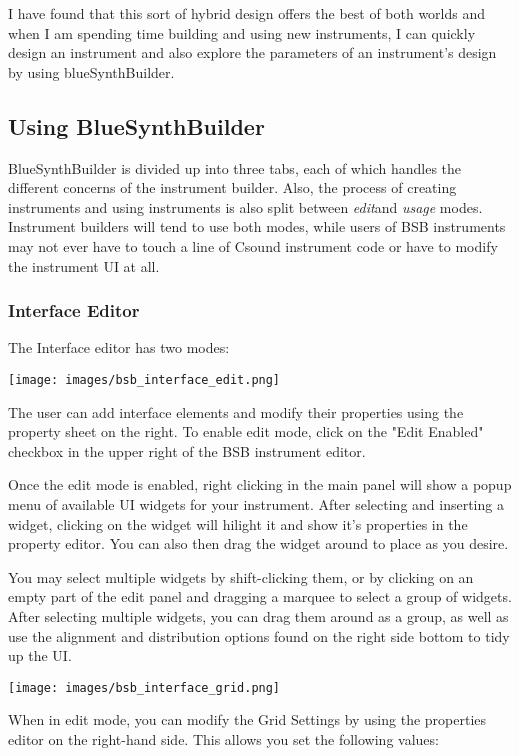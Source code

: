 I have found that this sort of hybrid design offers the best of both
worlds and when I am spending time building and using new instruments, I
can quickly design an instrument and also explore the parameters of an
instrument's design by using blueSynthBuilder.

\subsection{Using BlueSynthBuilder}

BlueSynthBuilder is divided up into three tabs, each of which handles
the different concerns of the instrument builder. Also, the process of
creating instruments and using instruments is also split between
\emph{edit}and \emph{usage} modes. Instrument builders will tend to use
both modes, while users of BSB instruments may not ever have to touch a
line of Csound instrument code or have to modify the instrument UI at
all.

\subsubsection{Interface Editor}

The Interface editor has two modes:

\texttt{[image: images/bsb\_interface\_edit.png]}

The user can add interface elements and modify their properties using
the property sheet on the right. To enable edit mode, click on the "Edit
Enabled" checkbox in the upper right of the BSB instrument editor.

Once the edit mode is enabled, right clicking in the main panel will
show a popup menu of available UI widgets for your instrument. After
selecting and inserting a widget, clicking on the widget will hilight it
and show it's properties in the property editor. You can also then drag
the widget around to place as you desire.

You may select multiple widgets by shift-clicking them, or by clicking
on an empty part of the edit panel and dragging a marquee to select a
group of widgets. After selecting multiple widgets, you can drag them
around as a group, as well as use the alignment and distribution options
found on the right side bottom to tidy up the UI.

\texttt{[image: images/bsb\_interface\_grid.png]}

When in edit mode, you can modify the Grid Settings by using the
properties editor on the right-hand side. This allows you set the
following values:

